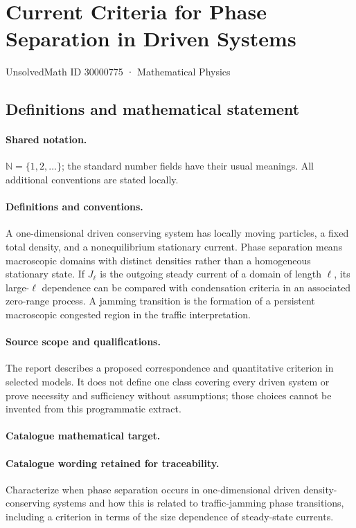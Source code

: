 \documentclass[11pt]{article}
\begin{document}
\setcounter{section}{30000774}
\section{Current Criteria for Phase Separation in Driven Systems}\label{30000775}
{\small UnsolvedMath ID 30000775 · Mathematical Physics}
\subsection{Definitions and mathematical statement}

\paragraph{Shared notation.}$\mathbb N=\{1,2,\ldots\}$; the standard number fields have their usual meanings. All additional conventions are stated locally.


\paragraph{Definitions and conventions.} A one-dimensional driven conserving system has locally moving particles, a fixed total density, and a nonequilibrium stationary current. Phase separation means macroscopic domains with distinct densities rather than a homogeneous stationary state. If $J_\ell$ is the outgoing steady current of a domain of length $\ell$, its large-$\ell$ dependence can be compared with condensation criteria in an associated zero-range process. A jamming transition is the formation of a persistent macroscopic congested region in the traffic interpretation.

\paragraph{Source scope and qualifications.} The report describes a proposed correspondence and quantitative criterion in selected models. It does not define one class covering every driven system or prove necessity and sufficiency without assumptions; those choices cannot be invented from this programmatic extract.

\paragraph{Catalogue mathematical target.}
\paragraph{Catalogue wording retained for traceability.}
Characterize when phase separation occurs in one-dimensional driven density-conserving systems and how this is related to traffic-jamming phase transitions, including a criterion in terms of the size dependence of steady-state currents.
\end{document}
